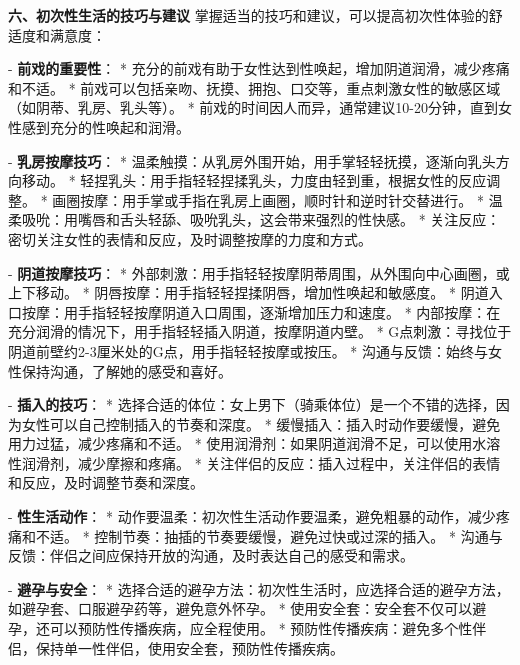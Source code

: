 \begin{enumerate}
  \textbf{六、初次性生活的技巧与建议}
  掌握适当的技巧和建议，可以提高初次性体验的舒适度和满意度：

  - \textbf{前戏的重要性}：
    * 充分的前戏有助于女性达到性唤起，增加阴道润滑，减少疼痛和不适。
    * 前戏可以包括亲吻、抚摸、拥抱、口交等，重点刺激女性的敏感区域（如阴蒂、乳房、乳头等）。
    * 前戏的时间因人而异，通常建议10-20分钟，直到女性感到充分的性唤起和润滑。

  - \textbf{乳房按摩技巧}：
    * 温柔触摸：从乳房外围开始，用手掌轻轻抚摸，逐渐向乳头方向移动。
    * 轻捏乳头：用手指轻轻捏揉乳头，力度由轻到重，根据女性的反应调整。
    * 画圈按摩：用手掌或手指在乳房上画圈，顺时针和逆时针交替进行。
    * 温柔吸吮：用嘴唇和舌头轻舔、吸吮乳头，这会带来强烈的性快感。
    * 关注反应：密切关注女性的表情和反应，及时调整按摩的力度和方式。

  - \textbf{阴道按摩技巧}：
    * 外部刺激：用手指轻轻按摩阴蒂周围，从外围向中心画圈，或上下移动。
    * 阴唇按摩：用手指轻轻捏揉阴唇，增加性唤起和敏感度。
    * 阴道入口按摩：用手指轻轻按摩阴道入口周围，逐渐增加压力和速度。
    * 内部按摩：在充分润滑的情况下，用手指轻轻插入阴道，按摩阴道内壁。
    * G点刺激：寻找位于阴道前壁约2-3厘米处的G点，用手指轻轻按摩或按压。
    * 沟通与反馈：始终与女性保持沟通，了解她的感受和喜好。

  - \textbf{插入的技巧}：
    * 选择合适的体位：女上男下（骑乘体位）是一个不错的选择，因为女性可以自己控制插入的节奏和深度。
    * 缓慢插入：插入时动作要缓慢，避免用力过猛，减少疼痛和不适。
    * 使用润滑剂：如果阴道润滑不足，可以使用水溶性润滑剂，减少摩擦和疼痛。
    * 关注伴侣的反应：插入过程中，关注伴侣的表情和反应，及时调整节奏和深度。

  - \textbf{性生活动作}：
    * 动作要温柔：初次性生活动作要温柔，避免粗暴的动作，减少疼痛和不适。
    * 控制节奏：抽插的节奏要缓慢，避免过快或过深的插入。
    * 沟通与反馈：伴侣之间应保持开放的沟通，及时表达自己的感受和需求。

  - \textbf{避孕与安全}：
    * 选择合适的避孕方法：初次性生活时，应选择合适的避孕方法，如避孕套、口服避孕药等，避免意外怀孕。
    * 使用安全套：安全套不仅可以避孕，还可以预防性传播疾病，应全程使用。
    * 预防性传播疾病：避免多个性伴侣，保持单一性伴侣，使用安全套，预防性传播疾病。


\end{enumerate}
